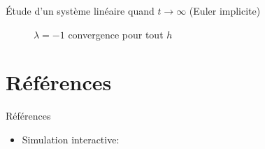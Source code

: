 \documentclass{beamer}
\begin{document}
\begin{frame}{Étude d'un système linéaire quand $t \rightarrow \infty$ (Euler implicite)}
    \begin{figure}
        \caption{$\lambda=-1$ convergence pour tout $h$}
    \end{figure}
\end{frame}

\section{Références}

\begin{frame}{Références}
    \begin{itemize}
        \item Simulation interactive: 
    \end{itemize}
\end{frame}
\end{document}
